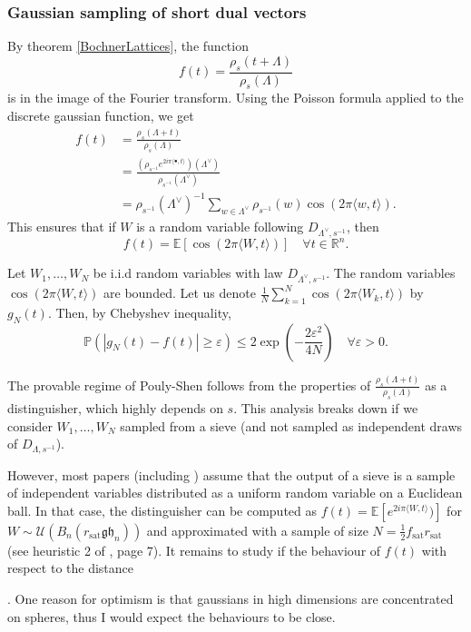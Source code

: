 \documentclass{article}
\newif\ifshowcomments
\DeclareRobustCommand{\TN}[1]{%
  \ifshowcomments
    {\color{orange} [TN][#1]}%
  \fi
}
\begin{document}
\subsubsection{Gaussian sampling of short dual vectors}
By theorem \ref{BochnerLattices}, the function 
\[f(t) = \frac{\rho_s(t+\Lambda)}{\rho_s(\Lambda)}\]
is in the image of the Fourier transform. Using the Poisson formula applied to the discrete gaussian function, we get 
\[\begin{split} 
f(t) & = \frac{ \rho_s (\Lambda + t)}{\rho_s (\Lambda )} \\ 
	& = \frac{ ( \rho_{s^{-1}} e^{2i\pi \langle \bullet , t\rangle }) (\Lambda^\vee) }{ \rho_{s^{-1}}(\Lambda^\vee)} \\
	& = \rho_{s^{-1}}(\Lambda^\vee)^{-1}\sum_{w\in \Lambda^\vee} \rho_{s^{-1}}(w) \cos (2\pi \langle w,t\rangle ) .
\end{split}\]
This ensures that if $W$ is a random variable following $D_{\Lambda^\vee, s^{-1}}$, then 
\[f(t) = \mathbb E[\cos (2\pi \langle W , t \rangle ) ] \quad \forall t\in \mathbb R^n.\] 

Let $W_1,\ldots , W_N$ be i.i.d random variables with law $D_{\Lambda^\vee, s^{-1}}$. The random variables $\cos (2\pi \langle W , t \rangle ) $ are bounded. 
Let us denote $\frac{1}{N}\sum_{k=1}^N \cos (2\pi \langle W_k , t \rangle )$ by $g_N(t)$. Then, by Chebyshev inequality,
\[\mathbb P( |g_N(t) - f(t) |\geq \varepsilon ) \leq  2 \exp( - \frac{2\varepsilon^2}{4N}) \quad \forall \varepsilon >0.\]

The provable regime of Pouly-Shen follows from the properties of $\frac{ \rho_s (\Lambda + t)}{\rho_s (\Lambda )}$ as a distinguisher, which highly depends on $s$. This analysis breaks down if we consider $W_1,\ldots , W_N$ sampled from a sieve (and not sampled as independent draws of $D_{\Lambda,s^{-1}}$). 

However, most papers (including \cite{ducas2023accurate}) assume that the output of a sieve is a sample of independent variables distributed as a uniform random variable on a Euclidean ball. In that case, the distinguisher can be computed as $f(t) = \mathbb E[e^{2i\pi\langle W , t \rangle} )]$ for $W\sim \mathcal U(B_n(r_{\text{sat}} \mathfrak{gh}_n))$ and approximated with a sample of size $N = \frac{1}{2}f_{\text{sat}}r_{\text{sat}} $ (see heuristic 2 of \cite{ducas2023accurate}, page 7). It remains to study if the behaviour of $f(t)$ with respect to the distance \TN{Il manque un bout de phrase ?}. One reason for optimism is that gaussians in high dimensions are concentrated on spheres, thus I would expect the behaviours to be close. 
\end{document}

